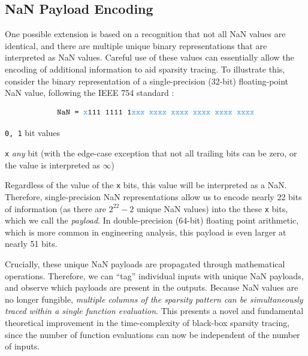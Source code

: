 \subsection{NaN Payload Encoding}

One possible extension is based on a recognition that not all NaN values are identical, and there are multiple unique binary representations that are interpreted as NaN values. Careful use of these values can essentially allow the encoding of additional information to aid sparsity tracing. To illustrate this, consider the binary representation of a single-precision (32-bit) floating-point NaN value, following the IEEE 754 standard \cite{ieee754}:

\newcommand{\pbit}[1]{\texttt{\textcolor{mydodgerblue}{#1}}} %

\begin{equation*}
    \texttt{NaN = \textcolor{mydodgerblue}{x}111 1111 1\textcolor{mydodgerblue}{xxx xxxx xxxx xxxx xxxx xxxx}}
\end{equation*}


\begin{eqexpl}[20mm]
    \item {\texttt{0, 1}} bit values
    \item {\pbit{x}} \emph{any} bit (with the edge-case exception that not all trailing bits can be zero, or the value is interpreted as $\infty$)
\end{eqexpl}

Regardless of the value of the \pbit{x} bits, this value will be interpreted as a NaN. Therefore, single-precision NaN representations allow us to encode nearly 22 bits of information (as there are $2^{22} - 2$ unique NaN values) into the these \pbit{x} bits, which we call the \emph{payload}. In double-precision (64-bit) floating point arithmetic, which is more common in engineering analysis, this payload is even larger at nearly 51 bits.

Crucially, these unique NaN payloads are propagated through mathematical operations. Therefore, we can ``tag'' individual inputs with unique NaN payloads, and observe which payloads are present in the outputs. Because NaN values are no longer fungible, \emph{multiple columns of the sparsity pattern can be simultaneously traced within a single function evaluation}. This presents a novel and fundamental theoretical improvement in the time-complexity of black-box sparsity tracing, since the number of function evaluations can now be independent of the number of inputs.

